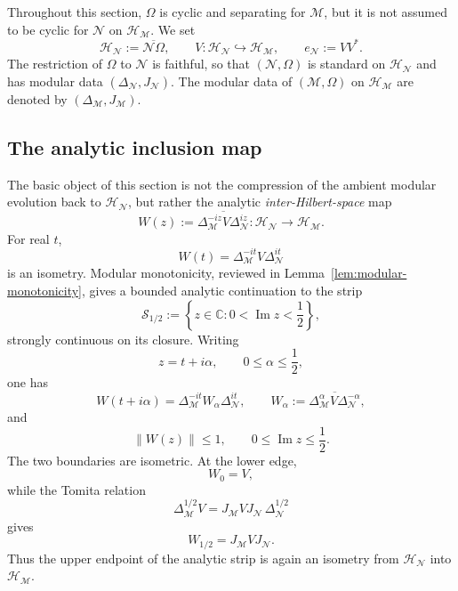 \documentclass[a4paper,11pt]{article}
\theoremstyle{definition}
\newcommand{\mN}{\mathcal{N}}
\newcommand{\mH}{\mathcal{H}}
\newcommand{\mM}{\mathcal{M}}
\begin{document}
Throughout this section, $\Omega$ is cyclic and separating for
$\mM$, but it is not assumed to be cyclic for $\mN$ on
$\mH_{\mM}$. We set
\begin{equation}
    \mH_{\mN}
    :=
    \overline{\mN\Omega},
    \qquad
    V:\mH_{\mN}\hookrightarrow\mH_{\mM},
    \qquad
    e_{\mN}:=VV^* .
    \label{eq:probing-HN}
\end{equation}
The restriction of $\Omega$ to $\mN$ is faithful, so that
$(\mN,\Omega)$ is standard on $\mH_{\mN}$ and has modular data
$(\Delta_{\mN},J_{\mN})$. The modular data of $(\mM,\Omega)$ on
$\mH_{\mM}$ are denoted by $(\Delta_{\mM},J_{\mM})$.

\subsection{The analytic inclusion map}

The basic object of this section is not the compression of the ambient
modular evolution back to $\mH_{\mN}$, but rather the analytic
\emph{inter-Hilbert-space} map
\begin{equation}
    W(z)
    :=
    \overline{
    \Delta_{\mM}^{-iz}V\Delta_{\mN}^{iz}}
    :
    \mH_{\mN}\longrightarrow\mH_{\mM} .
    \label{eq:Wz-definition}
\end{equation}
For real $t$,
\begin{equation}
    W(t)=\Delta_{\mM}^{-it}V\Delta_{\mN}^{it}
\end{equation}
is an isometry. Modular monotonicity, reviewed in
Lemma~\ref{lem:modular-monotonicity}, gives a bounded analytic continuation
to the strip
\begin{equation}
    \mathcal S_{1/2}
    :=
    \left\{
    z\in\mathbb C:
    0<\operatorname{Im}z<\frac12
    \right\},
\end{equation}
strongly continuous on its closure. Writing
\begin{equation}
    z=t+i\alpha,
    \qquad
    0\leq\alpha\leq\frac12 ,
\end{equation}
one has
\begin{equation}
    W(t+i\alpha)
    =
    \Delta_{\mM}^{-it}
    W_\alpha
    \Delta_{\mN}^{it},
    \qquad
    W_\alpha
    :=
    \overline{
    \Delta_{\mM}^\alpha V\Delta_{\mN}^{-\alpha}},
    \label{eq:W-alpha-strip}
\end{equation}
and
\begin{equation}
    \boxed{
    \|W(z)\|\leq1,
    \qquad
    0\leq\operatorname{Im}z\leq\frac12 .
    }
    \label{eq:W-strip-bound}
\end{equation}
The two boundaries are isometric. At the lower edge,
\begin{equation}
    W_0=V,
\end{equation}
while the Tomita relation
\begin{equation}
    \Delta_{\mM}^{1/2}V
    =
    J_{\mM}VJ_{\mN}\,\Delta_{\mN}^{1/2}
\end{equation}
gives
\begin{equation}
    \boxed{
    W_{1/2}=J_{\mM}VJ_{\mN} .
    }
    \label{eq:W-half}
\end{equation}
Thus the upper endpoint of the analytic strip is again an isometry from
$\mH_{\mN}$ into $\mH_{\mM}$.
\end{document}
